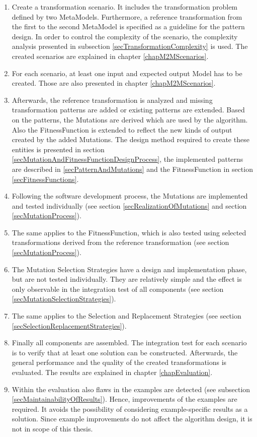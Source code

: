 \begin{enumerate}
	\item Create a transformation scenario. It includes the transformation problem defined by two \glspl{MetaModel}. Furthermore, a reference transformation from the first to the second \gls{MetaModel} is specified as a guideline for the pattern design. In order to control the complexity of the scenario, the complexity analysis presented in subsection \ref{secTransformationComplexity} is used. The created scenarios are explained in chapter \ref{chapM2MScenarios}.
	\item For each scenario, at least one input and expected output \gls{Model} has to be created. Those are also presented in chapter \ref{chapM2MScenarios}.
	\item Afterwards, the reference transformation is analyzed and missing transformation patterns are added or existing patterns are extended. Based on the patterns, the \glspl{Mutation} are derived which are used by the algorithm. Also the \gls{FitnessFunction} is extended to reflect the new kinds of output created by the added \glspl{Mutation}. The design method required to create these entities is presented in section \ref{secMutationAndFitnessFunctionDesignProcess}, the implemented patterns are described in \ref{secPatternAndMutations} and the \gls{FitnessFunction} in section \ref{secFitnessFunctions}.
	\item Following the software development process, the \glspl{Mutation} are implemented and tested individually (see section \ref{secRealizationOfMutations} and section \ref{secMutationProcess}).
	\item The same applies to the \gls{FitnessFunction}, which is also tested using selected transformations derived from the reference transformation (see section \ref{secMutationProcess}).
	\item The Mutation Selection Strategies have a design and implementation phase, but are not tested individually. They are relatively simple and the effect is only observable in the integration test of all components (see section \ref{secMutationSelectionStrategies}).
	\item The same applies to the Selection and Replacement Strategies (see section \ref{secSelectionReplacementStrategies}).
	\item Finally all components are assembled. The integration test for each scenario is to verify that at least one solution can be constructed. Afterwards, the general performance and the quality of the created transformations is evaluated. The results are explained in chapter \ref{chapEvaluation}.
	\item Within the evaluation also flaws in the examples are detected (see subsection \ref{secMaintainabilityOfResults}). Hence, improvements of the examples are required. It avoids the possibility of considering example-specific results as a solution. Since example improvements do not affect the algorithm design, it is not in scope of this thesis.
\end{enumerate}